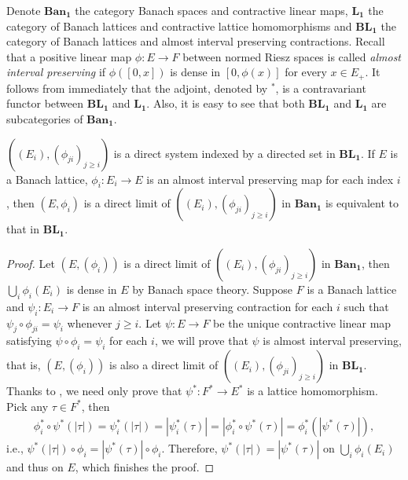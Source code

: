  Denote $\mathbf{Ban_1}$ the category Banach spaces and contractive linear maps, $\mathbf{L_1}$ the category of Banach lattices and contractive lattice homomorphisms and $\mathbf{BL_1}$ the category of Banach lattices and almost interval preserving contractions. Recall that a positive linear map $\phi:E\to F$ between normed Riesz spaces is called \emph{almost interval preserving} if $\phi([0, x])$ is dense in $[0,\phi(x)]$ for every $x\in E_+$. It follows from \cite[Proposition 1.3.13]{meyer-nieberg_BANACH_LATTICES:1991} immediately that the adjoint, denoted by $^*$, is a contravariant functor between $\mathbf{BL_1}$ and $\mathbf{L_1}$. Also, it is easy to see that both $\mathbf{BL_1}$  and $\mathbf{L_1}$ are subcategories of $\mathbf{Ban_1}$. 
 
\begin{lemma}\label{direct_limit_from_Ban_1}
$((E_i),(\phi_{ji})_{j\geq i})$ is a direct system indexed by a directed set in $\mathbf{BL_1}$. If $E$ is a Banach lattice, $\phi_i:E_i\to E$ is an almost interval preserving map for each index $i$, then $(E,\phi_i)$ is a direct limit of $((E_i),(\phi_{ji})_{j\geq i})$ in $\mathbf{Ban_1}$ is equivalent to that in $\mathbf{BL_1}$.
\end{lemma}
\begin{proof}
Let $(E,(\phi_i))$ is a direct limit  of $((E_i),(\phi_{ji})_{j\geq i})$ in $\mathbf{Ban_1}$, then $\bigcup_{i}\phi_i(E_i)$ is dense in $E$ by Banach space theory.
Suppose $F$ is a Banach lattice and $\psi_i:E_i\to F$ is an almost interval preserving contraction for each $i$ such that $\psi_j\circ\phi_{ji}=\psi_i$ whenever $j\geq i$. Let $\psi:E\to F$ be the unique contractive linear map satisfying $\psi\circ\phi_i=\psi_i$ for each $i$, we will prove that $\psi$ is almost interval preserving, that is, $(E,(\phi_i))$ is also a direct limit  of $((E_i),(\phi_{ji})_{j\geq i})$ in $\mathbf{BL_1}$.
Thanks to \cite[Proposition 1.3.13]{meyer-nieberg_BANACH_LATTICES:1991}, we need only prove that $\psi^*:F^*\to E^*$ is a lattice homomorphism.
Pick any $\tau\in F^*$, then \begin{align*}\phi_i^*\circ\psi^*(|\tau|)=\psi_i^*(|\tau|)=|\psi_i^*(\tau)|=|\phi_i^*\circ\psi^*(\tau)|=\phi_i^*(|\psi^*(\tau)|),\end{align*} i.e., $\psi^*(|\tau|)\circ\phi_i=|\psi^*(\tau)|\circ\phi_i$. Therefore, $\psi^*(|\tau|)=|\psi^*(\tau)|$ on $\bigcup_i\phi_i(E_i)$ and thus on $E$, which finishes the proof.
\end{proof}

